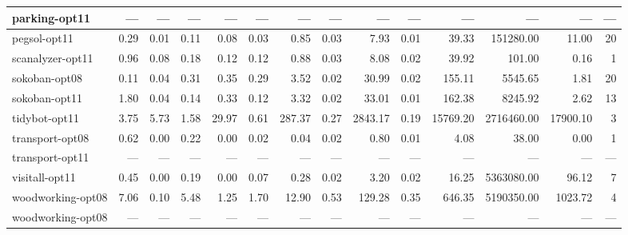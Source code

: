 \documentclass[a4paper,12pt]{article}
\begin{document}
\begin{table}[]
\begin{tabular}{l@{\hspace{6pt}} *{13}{|r}}
parking-opt11           & --- & --- & --- & --- & --- & --- & --- & --- & --- & --- & --- & --- & --- \\ \hline
pegsol-opt11            & 0.29 & 0.01 & 0.11 & 0.08 & 0.03 & 0.85 & 0.03 & 7.93 & 0.01 & 39.33 & 151280.00 & 11.00 & 20 \\ \hline
scanalyzer-opt11        & 0.96 & 0.08 & 0.18 & 0.12 & 0.12 & 0.88 & 0.03 & 8.08 & 0.02 & 39.92 & 101.00 & 0.16 & 1 \\ \hline
sokoban-opt08           & 0.11 & 0.04 & 0.31 & 0.35 & 0.29 & 3.52 & 0.02 & 30.99 & 0.02 & 155.11 & 5545.65 & 1.81 & 20 \\ \hline
sokoban-opt11           & 1.80 & 0.04 & 0.14 & 0.33 & 0.12 & 3.32 & 0.02 & 33.01 & 0.01 & 162.38 & 8245.92 & 2.62 & 13 \\ \hline
tidybot-opt11           & 3.75 & 5.73 & 1.58 & 29.97 & 0.61 & 287.37 & 0.27 & 2843.17 & 0.19 & 15769.20 & 2716460.00 & 17900.10 & 3 \\ \hline
transport-opt08         & 0.62 & 0.00 & 0.22 & 0.00 & 0.02 & 0.04 & 0.02 & 0.80 & 0.01 & 4.08 & 38.00 & 0.00 & 1 \\ \hline
transport-opt11         & --- & --- & --- & --- & --- & --- & --- & --- & --- & --- & --- & --- & --- \\ \hline
visitall-opt11          & 0.45 & 0.00 & 0.19 & 0.00 & 0.07 & 0.28 & 0.02 & 3.20 & 0.02 & 16.25 & 5363080.00 & 96.12 & 7 \\ \hline
woodworking-opt08       & 7.06 & 0.10 & 5.48 & 1.25 & 1.70 & 12.90 & 0.53 & 129.28 & 0.35 & 646.35 & 5190350.00 & 1023.72 & 4 \\ \hline
woodworking-opt08       & --- & --- & --- & --- & --- & --- & --- & --- & --- & --- & --- & --- & --- \\ \hline
\end{tabular}
\end{table}

\fi


\newpage

%
\end{document}
